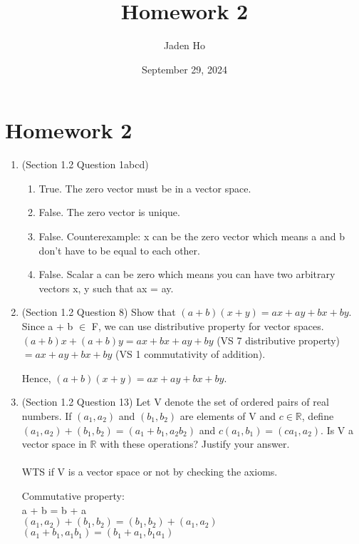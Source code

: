 \documentclass[12pt]{article}
\title{Homework 2}
\author{Jaden Ho}
\date{September 29, 2024}
\begin{document}
\maketitle

\section{Homework 2}

\begin{enumerate}
    \item (Section 1.2 Question 1abcd) 
        \begin{enumerate}[label=(\alph*)]
            \item True. The zero vector must be in a vector space.
            \item False. The zero vector is unique.
            \item False. Counterexample: x can be the zero vector which means a and b don't have to be equal to each other.
            \item False. Scalar a can be zero which means you can have two arbitrary vectors x, y such that ax = ay. 
        \end{enumerate} 
    \item (Section 1.2 Question 8)
        Show that $(a + b)(x + y) = ax + ay + bx + by$. 
        Since a + b $\in$ F, we can use distributive property for vector spaces. \\
        $(a + b)x + (a + b)y = ax + bx + ay + by$  (VS 7 distributive property) 
        $= ax + ay + bx + by$ (VS 1 commutativity of addition). 
        
        Hence, $(a + b)(x + y) = ax + ay + bx + by$. \qedsymbol{}

    \item (Section 1.2 Question 13) 
        Let V denote the set of ordered pairs of real numbers. If $(a_1, a_2)$ and $(b_1, b_2)$ are elements of V and $c \in \mathbb{R}$, define \\
        $(a_1, a_2) + (b_1, b_2) = (a_1 + b_1, a_2b_2)$ and $c(a_1, b_1) = (ca_1, a_2)$. Is V a vector space in $\mathbb{R}$ with these operations? Justify your answer. \\ \\
        WTS if V is a vector space or not by checking the axioms.

        Commutative property: \\
        a + b = b + a \\
        $(a_1, a_2) + (b_1, b_2) = (b_1, b_2) + (a_1, a_2)$ \\
        $(a_1 + b_1, a_1b_1) = (b_1 + a_1, b_1a_1)$


\end{enumerate}
\end{document}
